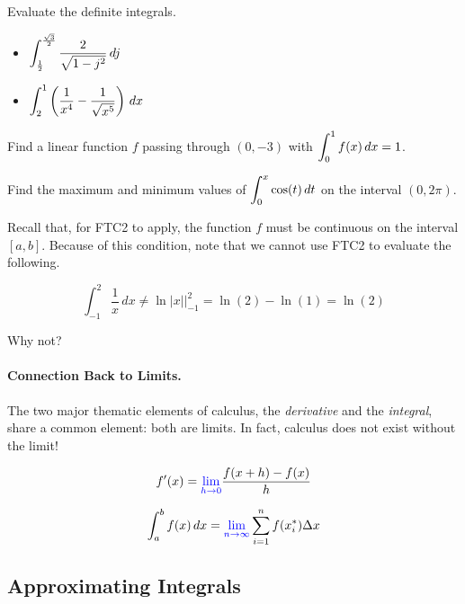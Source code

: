 \documentclass[12pt]{article}
\begin{document}
\newpage

\ExampleCont Evaluate the definite integrals.

\begin{itemize}
	\item[\tc{4}] $\displaystyle\int_{\frac{1}{2}}^{\frac{\sqrt{3}}{2}}\frac{2}{\sqrt{1-j^2}}\,dj$
	
	\vspace{35mm}
	
	\item[\tc{5}] $\displaystyle\int_2^1\left(\frac{1}{x^4}-\frac{1}{\sqrt{x^5}}\right)\,dx$
	
	\vspace{35mm}
\end{itemize}

\Example Find a linear function $f$ passing through $(0,-3)$ with $\displaystyle\int_0^1 f(x)\,dx=1$.

\newpage

\Example Find the maximum and minimum values of $\displaystyle\int_0^x \cos(t)\,dt$ on the interval $(0,2\pi)$.

\vspace{60mm}

Recall that, for FTC2 to apply, the function $f$ must be continuous on the interval $[a,b]$. Because of this condition, note that we cannot use FTC2 to evaluate the following.

$$\int_{-1}^2\frac{1}{x}\,dx\neq\ln |x|\Big|_{-1}^2=\ln(2)-\ln(1)=\ln(2)$$

Why not?

\vspace{10mm}

\paragraph{Connection Back to Limits.} The two major thematic elements of calculus, the \textit{derivative} and the \textit{integral}, share a common element: both are limits. In fact, calculus does not exist without the limit!

$$f'(x)=\textcolor{blue}{\lim_{h\to 0}}\frac{f(x+h)-f(x)}{h}$$

\vspace{2mm}

$$\int_a^b f(x)\,dx=\textcolor{blue}{\lim_{n\to\infty}}\sum_{i=1}^n f(x_i^*)\Delta x$$

\vspace{2mm}

\newpage

\subsection*{Approximating Integrals}
\end{document}
